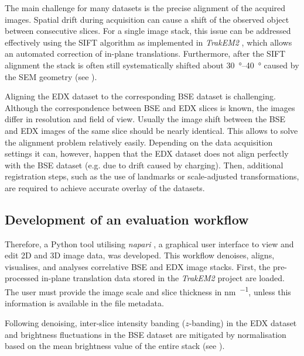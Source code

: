 The main challenge for many datasets is the precise alignment of the acquired images.
Spatial drift during acquisition can cause a shift of the observed object between consecutive slices.
For a single image stack, this issue can be addressed effectively using the \ac{SIFT} algorithm as implemented in \textit{TrakEM2} \cite{cardona.2012}, which allows an automated correction of in-plane translations.
Furthermore, after the \ac{SIFT} alignment the stack is often still systematically shifted about \qtyrange{30}{40}{\degree} caused by the \ac{SEM} geometry (see ).

Aligning the \ac{EDX} dataset to the corresponding \ac{BSE} dataset is challenging.
Although the correspondence between \ac{BSE} and \ac{EDX} slices is known, the images differ in resolution and field of view.
Usually the image shift between the \ac{BSE} and \ac{EDX} images of the same slice should be nearly identical.
This allows to solve the alignment problem relatively easily.
Depending on the data acquisition settings it can, however, happen that the \ac{EDX} dataset does not align perfectly with the \ac{BSE} dataset (e.g. due to drift caused by charging).
Then, additional registration steps, such as the use of landmarks or scale-adjusted transformations, are required to achieve accurate overlay of the datasets.

\subsection{Development of an evaluation workflow}

Therefore, a Python tool utilising \textit{napari} \cite{sofroniew.2025}, a graphical user interface to view and edit 2D and 3D image data, was developed.
This workflow denoises, aligns, visualises, and analyses correlative \ac{BSE} and \ac{EDX} image stacks.
First, the pre-processed in-plane translation data stored in the \textit{TrakEM2} project are loaded.
The user must provide the image scale and slice thickness in \unit{\nano\meter\per\px}, unless this information is available in the file metadata.

Following denoising, inter-slice intensity banding ($z$-banding) in the \ac{EDX} dataset and brightness fluctuations in the \ac{BSE} dataset are mitigated by normalisation based on the mean brightness value of the entire stack (see ).

